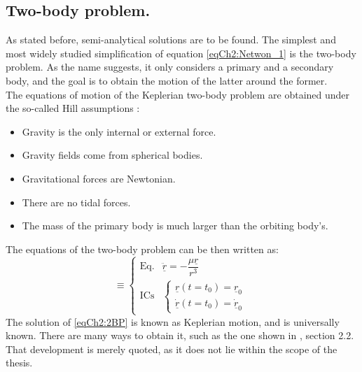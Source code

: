 		\subsection{Two-body problem.}
		\indent As stated before, semi-analytical solutions are to be found. The simplest and most widely studied simplification of equation \eqref{eqCh2:Netwon_1} is the two-body problem. As the name suggests, it only considers a primary and a secondary body, and the goal is to obtain the motion of the latter around the former. \\
		\indent The equations of motion of the Keplerian two-body problem are obtained under the so-called Hill assumptions \cite{SCFormationFlying}:
		\begin{itemize}
		\item[\GMVred{I.}] Gravity is the only internal or external force. 
		\item[\GMVred{II.}] Gravity fields come from spherical bodies.
		\item[\GMVred{III.}] Gravitational forces are Newtonian.
		\item[\GMVred{IV.}] There are no tidal forces.
		\item[\GMVred{V.}] The mass of the primary body is much larger than the orbiting body's.
		\end{itemize}
		\indent The equations of the two-body problem can be then written as:
		\begin{equation}
		[P]\equiv\left\{ \begin{array}{lcc}
		\text{Eq.} &  \ddot{\underline{r}} = -\dfrac{\mu \underline{r}}{r^3}\\[1em]
		\text{ICs} & \left\{ \begin{array}{ll}
		\underline{r} (t = t_0) = \underline{r}_{0} \\
		\dot{\underline{r}} (t = t_0) = \dot{\underline{r}}_{0} 
		\end{array}\right.
		\end{array}\right.
		\label{eqCh2:2BP}
		\end{equation}
		\indent The solution of \eqref{eqCh2:2BP} is known as Keplerian motion, and is universally known. There are many ways to obtain it, such as the one shown in \cite{SCFormationFlying}, section 2.2. That development is merely quoted, as it does not lie within the scope of the thesis.\\
